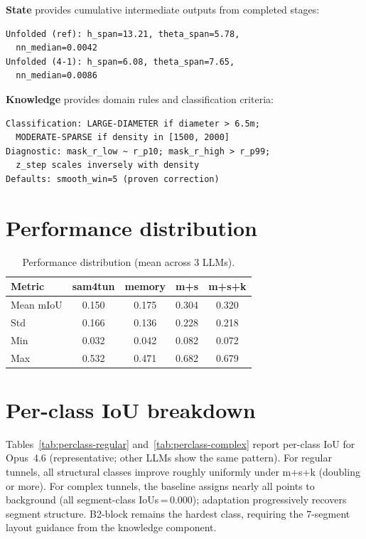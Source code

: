 \documentclass[a4paper,fleqn]{cas-dc}
\begin{document}
\textbf{State} provides cumulative intermediate outputs from completed stages:
\begin{verbatim}
Unfolded (ref): h_span=13.21, theta_span=5.78,
  nn_median=0.0042
Unfolded (4-1): h_span=6.08, theta_span=7.65,
  nn_median=0.0086
\end{verbatim}

\textbf{Knowledge} provides domain rules and classification criteria:
\begin{verbatim}
Classification: LARGE-DIAMETER if diameter > 6.5m;
  MODERATE-SPARSE if density in [1500, 2000]
Diagnostic: mask_r_low ~ r_p10; mask_r_high > r_p99;
  z_step scales inversely with density
Defaults: smooth_win=5 (proven correction)
\end{verbatim}

\section{Performance distribution}\label{app:distribution}

\begin{table}[ht]
\caption{Performance distribution (mean across 3 LLMs).}\label{tab:distribution}
\begin{tabular*}{\tblwidth}{@{} l c c c c @{}}
\toprule
Metric & sam4tun & memory & m+s & m+s+k \\
\midrule
Mean mIoU & 0.150 & 0.175 & 0.304 & 0.320 \\
Std & 0.166 & 0.136 & 0.228 & 0.218 \\
Min & 0.032 & 0.042 & 0.082 & 0.072 \\
Max & 0.532 & 0.471 & 0.682 & 0.679 \\
\bottomrule
\end{tabular*}
\end{table}

\section{Per-class IoU breakdown}\label{app:perclass}

Tables~\ref{tab:perclass-regular} and~\ref{tab:perclass-complex} report per-class IoU for Opus~4.6 (representative; other LLMs show the same pattern). For regular tunnels, all structural classes improve roughly uniformly under m+s+k (doubling or more). For complex tunnels, the baseline assigns nearly all points to background (all segment-class IoUs\,=\,0.000); adaptation progressively recovers segment structure. B2-block remains the hardest class, requiring the 7-segment layout guidance from the knowledge component.
\end{document}
